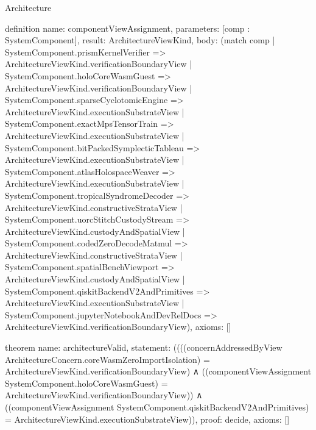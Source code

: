 \begin{lexlean}{Architecture}
\begin{semanticmodule}
definition{
  name: componentViewAssignment,
  parameters: [comp : SystemComponent],
  result: ArchitectureViewKind,
  body: (match comp
    | SystemComponent.prismKernelVerifier => ArchitectureViewKind.verificationBoundaryView
    | SystemComponent.holoCoreWasmGuest => ArchitectureViewKind.verificationBoundaryView
    | SystemComponent.sparseCyclotomicEngine => ArchitectureViewKind.executionSubstrateView
    | SystemComponent.exactMpsTensorTrain => ArchitectureViewKind.executionSubstrateView
    | SystemComponent.bitPackedSymplecticTableau => ArchitectureViewKind.executionSubstrateView
    | SystemComponent.atlasHolospaceWeaver => ArchitectureViewKind.executionSubstrateView
    | SystemComponent.tropicalSyndromeDecoder => ArchitectureViewKind.constructiveStrataView
    | SystemComponent.uorcStitchCustodyStream => ArchitectureViewKind.custodyAndSpatialView
    | SystemComponent.codedZeroDecodeMatmul => ArchitectureViewKind.constructiveStrataView
    | SystemComponent.spatialBenchViewport => ArchitectureViewKind.custodyAndSpatialView
    | SystemComponent.qiskitBackendV2AndPrimitives => ArchitectureViewKind.executionSubstrateView
    | SystemComponent.jupyterNotebookAndDevRelDocs => ArchitectureViewKind.verificationBoundaryView),
  axioms: []
}

theorem{
  name: architectureValid,
  statement: ((((concernAddressedByView ArchitectureConcern.coreWasmZeroImportIsolation)
      = ArchitectureViewKind.verificationBoundaryView)
    ∧ ((componentViewAssignment SystemComponent.holoCoreWasmGuest)
      = ArchitectureViewKind.verificationBoundaryView))
    ∧ ((componentViewAssignment SystemComponent.qiskitBackendV2AndPrimitives)
      = ArchitectureViewKind.executionSubstrateView)),
  proof: decide{},
  axioms: []
}

\end{semanticmodule}
\end{lexlean}
